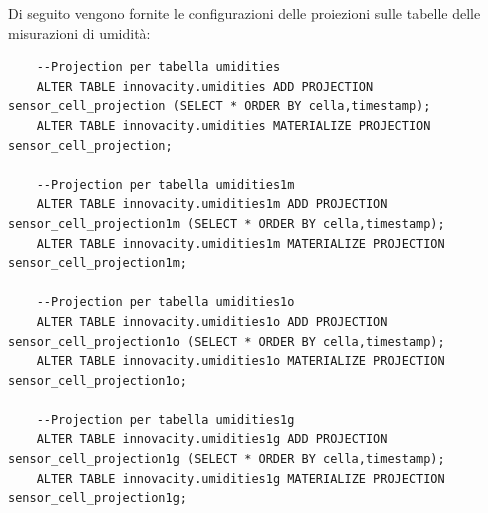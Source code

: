 Di seguito vengono fornite le configurazioni delle proiezioni sulle tabelle delle misurazioni di umidità:

\begin{lstlisting}
    --Projection per tabella umidities
    ALTER TABLE innovacity.umidities ADD PROJECTION sensor_cell_projection (SELECT * ORDER BY cella,timestamp);
    ALTER TABLE innovacity.umidities MATERIALIZE PROJECTION sensor_cell_projection;

    --Projection per tabella umidities1m
    ALTER TABLE innovacity.umidities1m ADD PROJECTION sensor_cell_projection1m (SELECT * ORDER BY cella,timestamp);
    ALTER TABLE innovacity.umidities1m MATERIALIZE PROJECTION sensor_cell_projection1m;

    --Projection per tabella umidities1o
    ALTER TABLE innovacity.umidities1o ADD PROJECTION sensor_cell_projection1o (SELECT * ORDER BY cella,timestamp);
    ALTER TABLE innovacity.umidities1o MATERIALIZE PROJECTION sensor_cell_projection1o;

    --Projection per tabella umidities1g
    ALTER TABLE innovacity.umidities1g ADD PROJECTION sensor_cell_projection1g (SELECT * ORDER BY cella,timestamp);
    ALTER TABLE innovacity.umidities1g MATERIALIZE PROJECTION sensor_cell_projection1g;
\end{lstlisting}